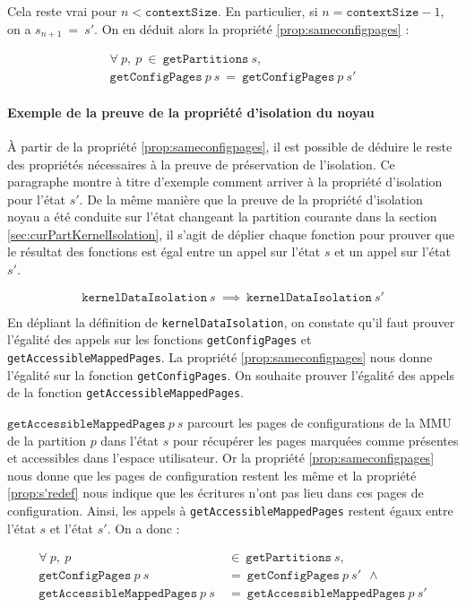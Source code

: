 			Cela reste vrai pour $n < \mathtt{contextSize}$. En particulier, si $n = \mathtt{contextSize} - 1$, on a $s_{n+1}~=~s'$. On en déduit alors la propriété \ref{prop:sameconfigpages} :

			\vspace{-0.25cm}
			\begin{gather*}
				\forall~p,~p~\in~\mathtt{getPartitions}~s,\\
				\mathtt{getConfigPages}~p~s~=~\mathtt{getConfigPages}~p~s'
			\end{gather*}

			\paragraph{Exemple de la preuve de la propriété d'isolation du noyau} À partir de la propriété \ref{prop:sameconfigpages}, il est possible de déduire le reste des propriétés nécessaires à la preuve de préservation de l'isolation. Ce paragraphe montre à titre d'exemple comment arriver à la propriété d'isolation pour l'état $s'$. De la même manière que la preuve de la propriété d'isolation noyau a été conduite sur l'état changeant la partition courante dans la section \ref{sec:curPartKernelIsolation}, il s'agit de déplier chaque fonction pour prouver que le résultat des fonctions est égal entre un appel sur l'état $s$ et un appel sur l'état $s'$.

			$$\mathtt{kernelDataIsolation}~s~\implies~\mathtt{kernelDataIsolation}~s'$$

			En dépliant la définition de \texttt{kernelDataIsolation}, on constate qu'il faut prouver l'égalité des appels sur les fonctions \texttt{getConfigPages} et \texttt{getAccessibleMappedPages}. La propriété \ref{prop:sameconfigpages} nous donne l'égalité sur la fonction \texttt{getConfigPages}. On souhaite prouver l'égalité des appels de la fonction \texttt{getAccessibleMappedPages}.

			$\mathtt{getAccessibleMappedPages}~p~s$ parcourt les pages de configurations de la MMU de la partition $p$ dans l'état $s$ pour récupérer les pages marquées comme présentes et accessibles dans l'espace utilisateur. Or la propriété \ref{prop:sameconfigpages} nous donne que les pages de configuration restent les même et la propriété \ref{prop:s'redef} nous indique que les écritures n'ont pas lieu dans ces pages de configuration. Ainsi, les appels à \texttt{getAccessibleMappedPages} restent égaux entre l'état $s$ et l'état $s'$. On a donc :

			\begin{align*}
				\forall~p,~p&\in~\mathtt{getPartitions}~s,\\
				\mathtt{getConfigPages}~p~s~&=~\mathtt{getConfigPages}~p~s'~~\wedge\\
				\mathtt{getAccessibleMappedPages}~p~s~&=~\mathtt{getAccessibleMappedPages}~p~s'
			\end{align*}


